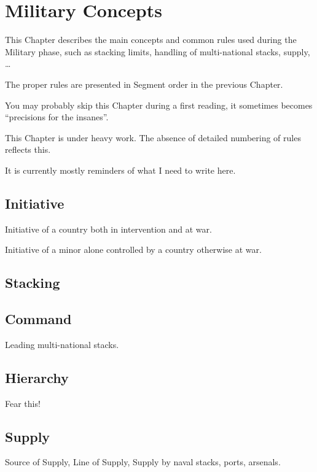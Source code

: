 
\chapter{Military Concepts}\label{chapter:MilitaryConcepts}

\begin{designnote}
  This Chapter describes the main concepts and common rules used
  during the Military phase, such as stacking limits, handling of
  multi-national stacks, supply, \ldots

  The proper rules are presented in Segment order in the previous
  Chapter.

  You may probably skip this Chapter during a first reading, it sometimes
  becomes ``precisions for the insanes''.
\end{designnote}

\begin{todo}
  This Chapter is under heavy work. The absence of detailed numbering of rules
  reflects this.

  It is currently mostly reminders of what I need to write here.
\end{todo}

\section{Initiative}
Initiative of a country both in intervention and at war.

Initiative of a minor alone controlled by a country otherwise at war.

\section{Stacking}

\section{Command}
Leading multi-national stacks.

\section{Hierarchy}
Fear this!

\section{Supply}
Source of Supply, Line of Supply, Supply by naval stacks, ports, arsenals.

